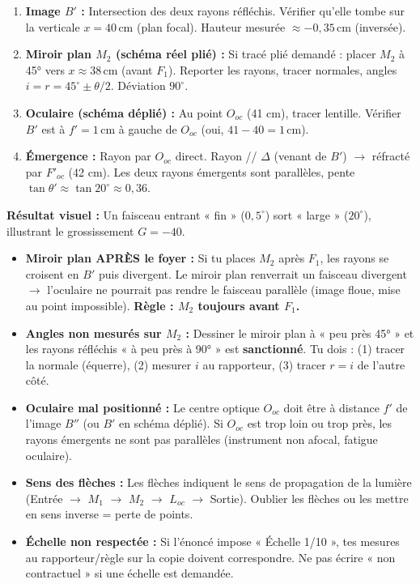 \documentclass[11pt]{article}
\begin{document}
\begin{exemplebox}
\begin{enumerate}
    \item \textbf{Image $B'$ :} Intersection des deux rayons réfléchis. Vérifier qu'elle tombe sur la verticale $x=40\,\text{cm}$ (plan focal). Hauteur mesurée $\approx -0,35\,\text{cm}$ (inversée).
    \item \textbf{Miroir plan $M_2$ (schéma réel plié) :} Si tracé plié demandé : placer $M_2$ à 45° vers $x \approx 38\,\text{cm}$ (avant $F_1$). Reporter les rayons, tracer normales, angles $i=r=45^\circ \pm \theta/2$. Déviation $90^\circ$.
    \item \textbf{Oculaire (schéma déplié) :} Au point $O_{oc}$ (41 cm), tracer lentille. Vérifier $B'$ est à $f'=1\,\text{cm}$ à gauche de $O_{oc}$ (oui, $41-40=1\,\text{cm}$).
    \item \textbf{Émergence :} Rayon par $O_{oc}$ direct. Rayon // $\Delta$ (venant de $B'$) $\to$ réfracté par $F'_{oc}$ (42 cm). Les deux rayons émergents sont parallèles, pente $\tan\theta' \approx \tan 20^\circ \approx 0,36$.
\end{enumerate}
\textbf{Résultat visuel :} Un faisceau entrant « fin » ($0,5^\circ$) sort « large » ($20^\circ$), illustrant le grossissement $G=-40$.
\end{exemplebox}

\begin{attention}
\begin{itemize}
    \item \textbf{Miroir plan APRÈS le foyer :} Si tu places $M_2$ après $F_1$, les rayons se croisent en $B'$ puis divergent. Le miroir plan renverrait un faisceau divergent $\rightarrow$ l'oculaire ne pourrait pas rendre le faisceau parallèle (image floue, mise au point impossible). \textbf{Règle : $M_2$ toujours avant $F_1$.}
    \item \textbf{Angles non mesurés sur $M_2$ :} Dessiner le miroir plan à « peu près 45° » et les rayons réfléchis « à peu près à 90° » est \textbf{sanctionné}. Tu dois : (1) tracer la normale (équerre), (2) mesurer $i$ au rapporteur, (3) tracer $r=i$ de l'autre côté.
    \item \textbf{Oculaire mal positionné :} Le centre optique $O_{oc}$ doit être à distance $f'$ de l'image $B''$ (ou $B'$ en schéma déplié). Si $O_{oc}$ est trop loin ou trop près, les rayons émergents ne sont pas parallèles (instrument non afocal, fatigue oculaire).
    \item \textbf{Sens des flèches :} Les flèches indiquent le sens de propagation de la lumière (Entrée $\to$ $M_1$ $\to$ $M_2$ $\to$ $L_{oc}$ $\to$ Sortie). Oublier les flèches ou les mettre en sens inverse = perte de points.
    \item \textbf{Échelle non respectée :} Si l'énoncé impose « Échelle 1/10 », tes mesures au rapporteur/règle sur la copie doivent correspondre. Ne pas écrire « non contractuel » si une échelle est demandée.
\end{itemize}
\end{attention}
\end{document}
